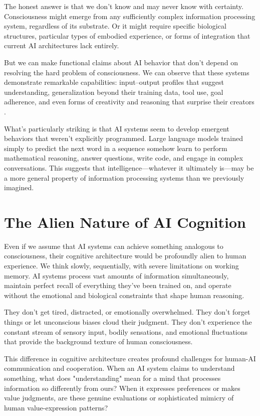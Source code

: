 The honest answer is that we don't know and may never know with certainty. Consciousness might emerge from any sufficiently complex information processing system, regardless of its substrate. Or it might require specific biological structures, particular types of embodied experience, or forms of integration that current AI architectures lack entirely.

But we can make functional claims about AI behavior that don't depend on resolving the hard problem of consciousness. We can observe that these systems demonstrate remarkable capabilities: input–output profiles that suggest understanding, generalization beyond their training data, tool use, goal adherence, and even forms of creativity and reasoning that surprise their creators \parencite{russell2019human,bostrom2014superintelligence}.

What's particularly striking is that AI systems seem to develop emergent behaviors that weren't explicitly programmed. Large language models trained simply to predict the next word in a sequence somehow learn to perform mathematical reasoning, answer questions, write code, and engage in complex conversations. This suggests that intelligence—whatever it ultimately is—may be a more general property of information processing systems than we previously imagined.

\section{The Alien Nature of AI Cognition}

Even if we assume that AI systems can achieve something analogous to consciousness, their cognitive architecture would be profoundly alien to human experience. We think slowly, sequentially, with severe limitations on working memory. AI systems process vast amounts of information simultaneously, maintain perfect recall of everything they've been trained on, and operate without the emotional and biological constraints that shape human reasoning.

They don't get tired, distracted, or emotionally overwhelmed. They don't forget things or let unconscious biases cloud their judgment. They don't experience the constant stream of sensory input, bodily sensations, and emotional fluctuations that provide the background texture of human consciousness.

This difference in cognitive architecture creates profound challenges for human-AI communication and cooperation. When an AI system claims to understand something, what does "understanding" mean for a mind that processes information so differently from ours? When it expresses preferences or makes value judgments, are these genuine evaluations or sophisticated mimicry of human value-expression patterns?

